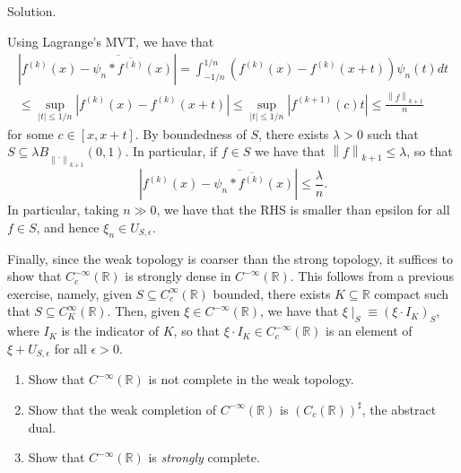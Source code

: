 \documentclass[12pt, reqno,a4paper, twoside]{amsproc}
\newcommand{\dbR}{\mathbb R}
\newcommand{\norm}[1]{\left\|#1\right\|}
\newcommand{\abs}[1]{\left|#1\right|}
\newcommand{\widebar}{\overline}
\newenvironment{sol}{\sc Solution. \rm}{\hfill \qedsymbol\bigskip}
\begin{document}
\begin{sol}
\begin{itemize}
		Using Lagrange's MVT, we have that
		\begin{multline*}
			\abs{f^{(k)}(x)-\widebar{\psi_n\ast \widebar{f^{(k)}}}(x)}=\int_{-1/n}^{1/n}(f^{(k)}(x)-f^{(k)}(x+t))\psi_n(t)dt\\\le \sup_{\abs{t}\le 1/n}\abs{f^{(k)}(x)-f^{(k)}(x+t)}
			\le \sup_{\abs{t}\le 1/n}\abs{f^{(k+1)}(c)t}\le\frac{\norm{f}_{k+1}}{n}
		\end{multline*}
		for some $c\in[x,x+t]$. By boundedness of $S$, there exists $\lambda>0$ such that $S\subseteq \lambda B_{\norm{\cdot}_{k+1}}(0,1)$. In particular, if $f\in S$ we have that $\norm{f}_{k+1}\le \lambda$, so that
		\[\abs{f^{(k)}(x)-\widebar{\psi_n\ast\widebar{f^{(k)}}}(x)}\le \frac{\lambda}{n}.\]
		In particular, taking $n\gg 0$, we have that the RHS is smaller than epsilon for all $f\in S$, and hence $\xi_n\in U_{S,\epsilon}$. 
		
		Finally, since the weak topology is coarser than the strong topology, it suffices to show that $C_c^{-\infty}(\dbR)$ is strongly dense in $C^{-\infty}(\dbR)$. This follows from a previous exercise, namely, given $S\subseteq C_c^\infty(\dbR)$ bounded, there exists $K\subseteq\dbR$ compact such that $S\subseteq C_K^\infty(\dbR)$. Then, given $\xi\in C^{-\infty}(\dbR)$, we have that $\xi\mid_S\equiv (\xi\cdot I_K)_S$, where $I_K$ is the indicator of $K$, so that $\xi\cdot I_K\in C^{-\infty}_c(\dbR)$ is an element of $\xi+U_{S,\epsilon}$ for all $\epsilon>0$. 
	\end{itemize}
\end{sol}
\begin{exer}
\begin{enumerate}
	\item  Show that $C^{-\infty}(\dbR)$ is not complete in the weak topology.
	\item Show that the weak completion of $C^{-\infty}(\dbR)$ is $(C_c(\dbR))^\sharp$, the abstract dual.
	\item  Show that $C^{-\infty}(\dbR)$ is \emph{strongly} complete. 
\end{enumerate}	
\end{exer}
\end{document}
